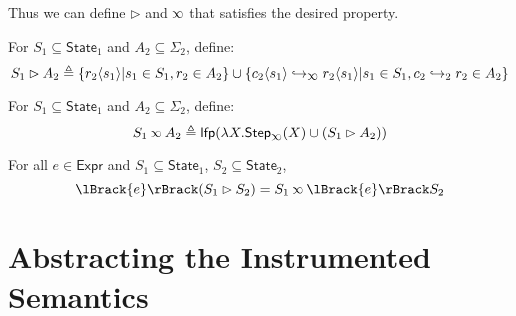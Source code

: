\documentclass[acmsmall,screen,review]{acmart}\settopmatter{printfolios=true,printccs=false,printacmref=false}
\newcommand*{\Expr}{\mathsf{Expr}}
\newcommand*{\config}{c}
\newcommand*{\rightst}{r}
\newcommand*{\State}{\mathsf{State}}
\newcommand*{\lfp}{\mathsf{lfp}}
\newcommand*{\Step}{\mathsf{Step}}
\newcommand*{\semarrow}{\hookrightarrow}
\newcommand*{\semlink}{\mathbin{\rotatebox[origin=c]{180}{$\propto$}}}
\newcommand*{\sembracket}[1]{\lBrack{#1}\rBrack}
\newcommand*{\inject}[2]{{#2}\langle{#1}\rangle}
\begin{document}
Thus we can define $\rhd$ and $\semlink$ that satisfies the desired property.
\begin{definition}[Injection]
  For $S_1\subseteq\State_1$ and $A_2\subseteq\Sigma_2$, define:
  \[
    S_1\rhd A_2\triangleq\{\inject{s_1}{\rightst_2}|s_1\in S_1,\rightst_2\in A_2\}\cup\{\inject{s_1}{\config_2}\semarrow_{\semlink}\inject{s_1}{\rightst_2}|s_1\in S_1,\config_2\semarrow_2\rightst_2\in A_2\}
  \]
\end{definition}
\begin{definition}
  For $S_1\subseteq\State_1$ and $A_2\subseteq\Sigma_2$, define:
  \[
    S_1\semlink A_2\triangleq\lfp(\lambda X.\Step_{\semlink}(X)\cup(S_1\rhd A_2))
  \]
\end{definition}
\begin{theorem}[Advance]
  For all $e\in\Expr$ and $S_1\subseteq\State_1$, $S_2\subseteq\State_2$,
  \[
    \sembracket{e}(S_1\rhd S_2)=S_1\semlink\sembracket{e}S_2
  \]
\end{theorem}

\section{Abstracting the Instrumented Semantics}
\end{document}
